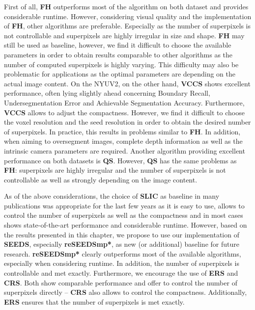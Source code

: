 First of all, \textbf{FH} outperforms most of the algorithm on both dataset and provides considerable runtime. However, considering visual quality and the implementation of \textbf{FH}, other algorithms are preferable. Especially as the number of superpixels is not controllable and superpixels are highly irregular in size and shape. \textbf{FH} may still be used as baseline, however, we find it difficult to choose the available parameters in order to obtain results comparable to other algorithms as the number of computed superpixels is highly varying. This difficulty may also be problematic for applications as the optimal parameters are depending on the actual image content. On the NYUV2, on the other hand, \textbf{VCCS} shows excellent performance, often lying slightly ahead concerning Boundary Recall, Undersegmentation Error and Achievable Segmentation Accuracy. Furthermore, \textbf{VCCS} allows to adjust the compactness. However, we find it difficult to choose the voxel resolution and the seed resolution in order to obtain the desired number of superpixels. In practice, this results in problems similar to \textbf{FH}. In addition, when aiming to oversegment images, complete depth information as well as the intrinsic camera parameters are required. Another algorithm providing excellent performance on both datasets is \textbf{QS}. However, \textbf{QS} has the same problems as \textbf{FH}: superpixels are highly irregular and the number of superpixels is not controllable as well as strongly depending on the image content.

As of the above considerations, the choice of \textbf{SLIC} as baseline in many publications \cite{HuazhuFuXiaochunCaoDaiTangYahongHanDongXu:2014, PaponAbramovSchoelerWoergoetter:2013, VanDenBerghBoixRoigCapitaniVanGool:2012,ConradMertzMester:2013} was appropriate for the last few years as it is easy to use, allows to control the number of superpixels as well as the compactness and in most cases shows state-of-the-art performance and considerable runtime. However, based on the results presented in this chapter, we propose to use our implementation of \textbf{SEEDS}, especially \textbf{reSEEDSmp*}, as new (or additional) baseline for future research. \textbf{reSEEDSmp*} clearly outperforms most of the available algorithms, especially when considering runtime. In addition, the number of superpixels is controllable and met exactly. Furthermore, we encourage the use of \textbf{ERS} and \textbf{CRS}. Both show comparable performance and offer to control the number of superpixels directly -- \textbf{CRS} also allows to control the compactness. Additionally, \textbf{ERS} ensures that the number of superpixels is met exactly.